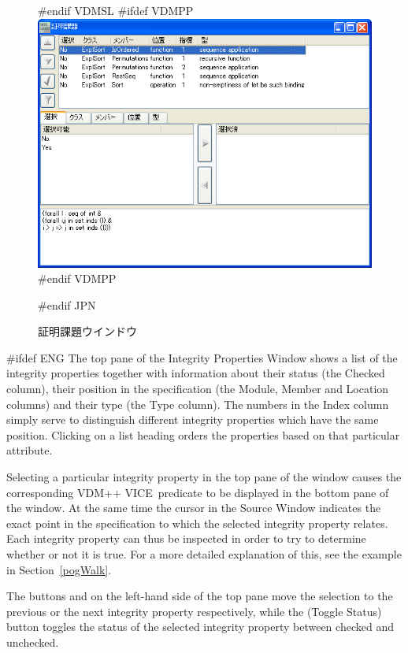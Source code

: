 \documentclass[\pformat,12pt]{article}
\newcommand{\vdmslpp}{VDM-SL}
\newcommand{\vdmslpp}{VDM++}
\renewcommand{\vdmslpp}{VDM++ VICE}
\newcommand{\guicmd}[1]{{\sf #1}}
\newcommand{\guicmd}[1]{{\gt #1}}
\begin{document}
\begin{figure}[tbh]
\begin{center}
#endif VDMSL
#ifdef VDMPP
\includegraphics[width=12.5cm]{integWin-pp.png}
#endif VDMPP
\caption{証明課題ウインドウ}
#endif JPN
\label{fig:integWin2}
\end{center}
\end{figure}

#ifdef ENG
The top pane of the \guicmd{Integrity Properties Window} shows a list
of the integrity properties together with information about their
status (the \guicmd{Checked} column), their position in the
specification (the \guicmd{Module}, \guicmd{Member} and
\guicmd{Location} columns) and 
their type (the \guicmd{Type} column). The numbers in the
\guicmd{Index} column simply serve to distinguish different integrity
properties which have the same position. Clicking on a list heading
orders the properties based on that particular attribute.

Selecting a particular integrity property in the top pane of the
window causes the corresponding \vdmslpp\ predicate to be displayed in
the bottom pane of the window. At the same time the cursor in the
\guicmd{Source Window} indicates the exact point in the specification to
which the selected integrity property relates. Each integrity property
can thus be inspected in order to try to determine whether or not it
is true. For a more detailed explanation of this, see the example in
Section~\ref{pogWalk}.

The buttons 
 and
 on the
left-hand side of the top pane move the selection to the previous or
the next integrity property respectively, while the 
(\guicmd{Toggle Status}) button toggles the status of the selected
integrity property between checked and unchecked.
\end{document}
